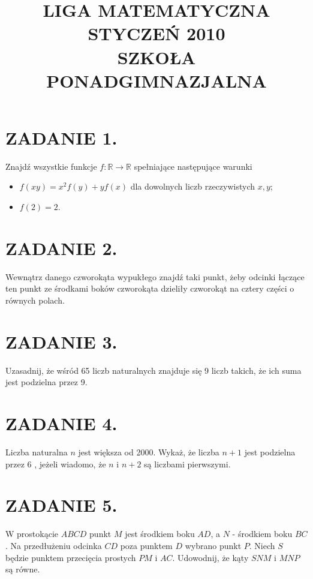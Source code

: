 \documentclass[10pt]{article}
\title{LIGA MATEMATYCZNA \\
 STYCZEŃ 2010 \\
 SZKOŁA PONADGIMNAZJALNA }
\author{}
\date{}
\begin{document}
\maketitle
\section*{ZADANIE 1.}
Znajdź wszystkie funkcje \(f: \mathbb{R} \rightarrow \mathbb{R}\) spełniające następujące warunki

\begin{itemize}
  \item \(f(x y)=x^{2} f(y)+y f(x)\) dla dowolnych liczb rzeczywistych \(x, y\);
  \item \(f(2)=2\).
\end{itemize}

\section*{ZADANIE 2.}
Wewnątrz danego czworokąta wypukłego znajdź taki punkt, żeby odcinki łączące ten punkt ze środkami boków czworokąta dzieliły czworokąt na cztery części o równych polach.

\section*{ZADANIE 3.}
Uzasadnij, że wśród 65 liczb naturalnych znajduje się 9 liczb takich, że ich suma jest podzielna przez 9.

\section*{ZADANIE 4.}
Liczba naturalna \(n\) jest większa od 2000. Wykaż, że liczba \(n+1\) jest podzielna przez 6 , jeżeli wiadomo, że \(n\) i \(n+2\) są liczbami pierwszymi.

\section*{ZADANIE 5.}
W prostokącie \(A B C D\) punkt \(M\) jest środkiem boku \(A D\), a \(N\) - środkiem boku \(B C\). Na przedłużeniu odcinka \(C D\) poza punktem \(D\) wybrano punkt \(P\). Niech \(S\) będzie punktem przecięcia prostych \(P M\) i \(A C\). Udowodnij, że kąty \(S N M\) i \(M N P\) są równe.
\end{document}
